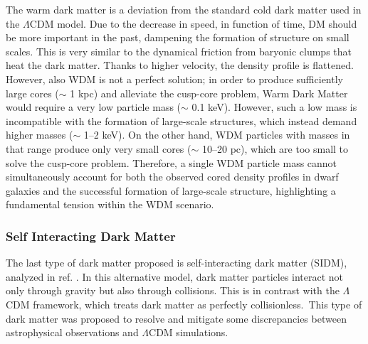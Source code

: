 The warm dark matter is a deviation from the standard cold dark matter used in the $\Lambda$CDM model. Due to the decrease in speed, in function of time, DM should be more important in the past, dampening the formation of structure on small scales. This is very similar to the dynamical friction from baryonic clumps that heat the dark matter. Thanks to higher velocity, the density profile is flattened. However, also WDM is not a perfect solution; in order to produce sufficiently large cores ($\sim$ 1 kpc) and alleviate the cusp-core problem, Warm Dark Matter would require a very low particle mass ($\sim$ 0.1 keV). However, such a low mass is incompatible with the formation of large-scale structures, which instead demand higher masses ($\sim$ 1–2 keV). On the other hand, WDM particles with masses in that range produce only very small cores ($\sim$ 10–20 pc), which are too small to solve the cusp-core problem. Therefore, a single WDM particle mass cannot simultaneously account for both the observed cored density profiles in dwarf galaxies and the successful formation of large-scale structure, highlighting a fundamental tension within the WDM scenario.

\subsubsection{Self Interacting Dark Matter}

The last type of dark matter proposed is self-interacting dark matter (SIDM), analyzed in ref. \cite{Galaxy-cluster-self-interacting-dark-matter-simulations}.
In this alternative model, dark matter particles interact not only through gravity but also through collisions. This is in contrast with the $\Lambda$CDM framework, which treats dark matter as perfectly collisionless.\
This type of dark matter was proposed to resolve and mitigate some discrepancies between astrophysical observations and $\Lambda$CDM simulations.\\

